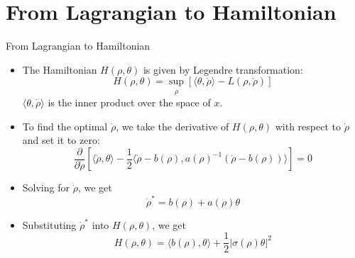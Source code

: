 \documentclass{beamer}
\begin{document}
\section{From Lagrangian to Hamiltonian}
\begin{frame}{From Lagrangian to Hamiltonian}
    \begin{itemize}
        \item The Hamiltonian $H(\rho, \theta)$ is given by Legendre transformation:
        \begin{equation}
            H(\rho, \theta) = \sup_{\dot{\rho}} \left[ \langle \theta, \dot{\rho} \rangle - L(\rho, \dot{\rho}) \right]
        \end{equation}
        $\langle \theta, \dot{\rho} \rangle$ is the inner product over the space of $x$.
        \item To find the optimal $\dot{\rho}$, we take the derivative of $H(\rho, \theta)$ with respect to $\dot{\rho}$ and set it to zero:
        \begin{equation}
            \frac{\partial}{\partial \dot{\rho}} \left[ \langle \dot{\rho}, \theta \rangle - \frac{1}{2} \langle \dot{\rho} - b(\rho), a(\rho)^{-1} (\dot{\rho} - b(\rho)) \rangle \right] = 0
        \end{equation}
        \item Solving for $\dot{\rho}$, we get
        \begin{equation}
            \dot{\rho}^* = b(\rho) + a(\rho)\theta
        \end{equation}
        \item Substituting $\dot{\rho}^*$ into $H(\rho, \theta)$, we get
        \begin{equation}
            H(\rho, \theta) = \langle b(\rho), \theta \rangle + \frac{1}{2} |\sigma(\rho)\theta|^2
        \end{equation}
    \end{itemize}
\end{frame}
\end{document}
